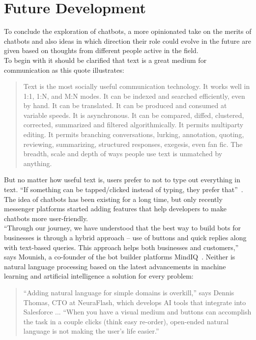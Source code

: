 \chapter{Future Development}

To conclude the exploration of chatbots, a more opinionated take on the merits of chatbots
and also ideas in which direction their role could evolve in the future are given
based on thoughts from different people active in the field.
\\

To begin with it should be clarified that text is a great medium for communication as this quote illustrates:

\begin{quote}
Text is the most socially useful communication technology. It works well in 1:1, 1:N, and M:N modes. It can be indexed and searched efficiently, even by hand. It can be translated. It can be produced and consumed at variable speeds. It is asynchronous. It can be compared, diffed, clustered, corrected, summarized and filtered algorithmically. It permits multiparty editing. It permits branching conversations, lurking, annotation, quoting, reviewing, summarizing, structured responses, exegesis, even fan fic. The breadth, scale and depth of ways people use text is unmatched by anything.~\cite{futuretext}
\end{quote}

But no matter how useful text is, users prefer to not to type out everything in text.
``If something can be tapped/clicked instead of typing, they prefer that''~\cite{chatbotslife}.
\\

The idea of chatbots has been existing for a long time,
but only recently messenger platforms started adding features that help developers to make chatbots more user-friendly.
\\

``Through our journey, we have understood that the best way to build bots for businesses is through a hybrid approach – use of buttons and quick replies along with text-based queries. This approach helps both businesses and customers,'' says Mounish, a co-founder of the bot builder platforms MindIQ~\cite{techinasia}.
Neither is natural language processing based on the latest advancements in machine learning and artificial intelligence a solution for every problem:

\begin{quote}
“Adding natural language for simple domains is overkill,” says Dennis Thomas, CTO at NeuraFlash, which develops AI tools that integrate into Salesforce ... “When you have a visual medium and buttons can accomplish the task in a couple clicks (think easy re-order), open-ended natural language is not making the user’s life easier.”~\cite{neednlp}
\end{quote}

